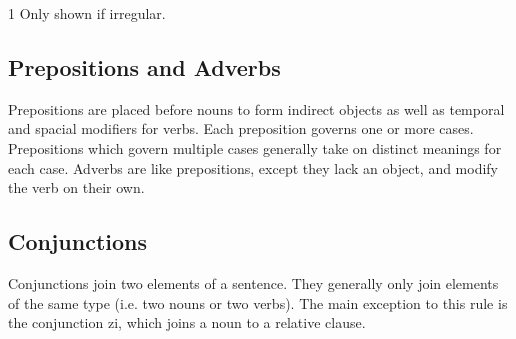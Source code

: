 \begin{table}[h]
\centering
\caption{Numbers}
\label{tab:numbers}
\begin{threeparttable}
\begin{tablenotes}
\item[1] Only shown if irregular.
\end{tablenotes}
\end{threeparttable}
\end{table}

\subsection{Prepositions and Adverbs}
Prepositions are placed before nouns to form indirect objects as well as
temporal and spacial modifiers for verbs. Each preposition governs one or more
cases. Prepositions which govern multiple cases generally take on distinct
meanings for each case. Adverbs are like prepositions, except they lack an
object, and modify the verb on their own.

\subsection{Conjunctions}
Conjunctions join two elements of a sentence. They generally only join elements
of the same type (i.e. two nouns or two verbs). The main exception to this rule
is the conjunction {\ll zi}, which joins a noun to a relative clause.

